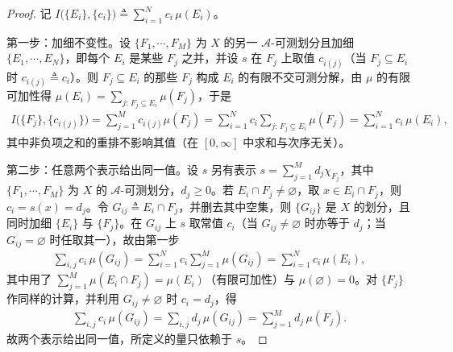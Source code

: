\documentclass[../../main.tex]{subfiles}%
\begin{document}
\begin{proof}
记 $I\big(\{E_i\},\{c_i\}\big)\triangleq\sum_{i=1}^Nc_i\,\mu(E_i)$。

第一步：加细不变性。设 $\{F_1,\cdots ,F_M\}$ 为 $X$ 的另一 $\mathscr A$-可测划分且加细 $\{E_1,\cdots ,E_N\}$，即每个 $E_i$ 是某些 $F_j$ 之并，并设 $s$ 在 $F_j$ 上取值 $c_{i(j)}$（当 $F_j\subseteq E_i$ 时 $c_{i(j)}\triangleq c_i$）。则 $F_j\subseteq E_i$ 的那些 $F_j$ 构成 $E_i$ 的有限不交可测分解，由 $\mu$ 的有限可加性得 $\mu(E_i)=\sum_{j:\,F_j\subseteq E_i}\mu(F_j)$，于是
\begin{align*}
I\big(\{F_j\},\{c_{i(j)}\}\big)
=\sum_{j=1}^Mc_{i(j)}\mu(F_j)
=\sum_{i=1}^Nc_i\sum_{j:\,F_j\subseteq E_i}\mu(F_j)
=\sum_{i=1}^Nc_i\,\mu(E_i),
\end{align*}
其中非负项之和的重排不影响其值（在 $[0,\infty]$ 中求和与次序无关）。

第二步：任意两个表示给出同一值。设 $s$ 另有表示 $s=\sum_{j=1}^Md_j\chi_{F_j}$，其中 $\{F_1,\cdots ,F_M\}$ 为 $X$ 的 $\mathscr A$-可测划分，$d_j\geqslant0$。若 $E_i\cap F_j\neq\varnothing$，取 $x\in E_i\cap F_j$，则 $c_i=s(x)=d_j$。令 $G_{ij}\triangleq E_i\cap F_j$，并删去其中空集，则 $\{G_{ij}\}$ 是 $X$ 的划分，且同时加细 $\{E_i\}$ 与 $\{F_j\}$。在 $G_{ij}$ 上 $s$ 取常值 $c_i$（当 $G_{ij}\neq\varnothing$ 时亦等于 $d_j$；当 $G_{ij}=\varnothing$ 时任取其一），故由第一步
\begin{align*}
\sum_{i,j}c_i\,\mu(G_{ij})=\sum_{i=1}^Nc_i\sum_{j=1}^M\mu(G_{ij})=\sum_{i=1}^Nc_i\,\mu(E_i),
\end{align*}
其中用了 $\sum_{j=1}^M\mu(E_i\cap F_j)=\mu(E_i)$（有限可加性）与 $\mu(\varnothing)=0$。对 $\{F_j\}$ 作同样的计算，并利用 $G_{ij}\neq\varnothing$ 时 $c_i=d_j$，得
\begin{align*}
\sum_{i,j}c_i\,\mu(G_{ij})=\sum_{i,j}d_j\,\mu(G_{ij})=\sum_{j=1}^Md_j\,\mu(F_j).
\end{align*}
故两个表示给出同一值，所定义的量只依赖于 $s$。


\end{proof}
\end{document}
